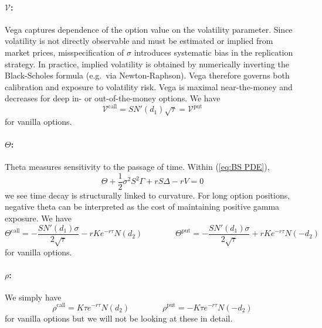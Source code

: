 \documentclass[12pt]{article}
\theoremstyle{definition}
\theoremstyle{remark}
\begin{document}
\paragraph{$\mathcal{V}$:} Vega captures dependence of the option value on the volatility parameter. Since volatility is not directly observable and must be estimated or implied from market prices, misspecification of $\sigma$ introduces systematic bias in the replication strategy. In practice, implied volatility is obtained by numerically inverting the Black-Scholes formula (e.g.\ via Newton-Raphson). Vega therefore governs both calibration and exposure to volatility risk. Vega is maximal near-the-money and decreases for deep in- or out-of-the-money options. We have
$$
\mathcal{V}^\mathrm{call} = S N'(d_1) \sqrt{\tau} = \mathcal{V}^\mathrm{put}
$$
for vanilla options.

\paragraph{$\Theta$:} Theta measures sensitivity to the passage of time. Within (\ref{eq:BS PDE}),
$$
\Theta + \frac{1}{2}\sigma^2 S^2 \Gamma + rS\Delta - rV = 0
$$
we see time decay is structurally linked to curvature. For long option positions, negative theta can be interpreted as the cost of maintaining positive gamma exposure. We have
$$
\Theta^\mathrm{call} = -\frac{S N'(d_1) \sigma}{2\sqrt{\tau}} - r K e^{-r\tau} N(d_2)
\qquad\qquad
\Theta^\mathrm{put} = -\frac{S N'(d_1) \sigma}{2\sqrt{\tau}} + r K e^{-r\tau} N(-d_2)
$$
for vanilla options.

\paragraph{$\rho$:} We simply have
$$
\rho^\mathrm{call} = K \tau e^{-r\tau} N(d_2)
\qquad\qquad
\rho^\mathrm{put} = -K \tau e^{-r\tau} N(-d_2)
$$
for vanilla options but we will not be looking at these in detail.
\end{document}
